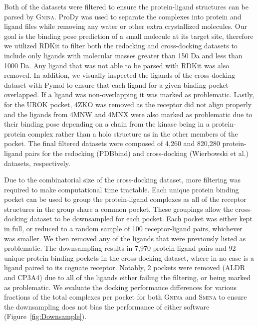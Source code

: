 \documentclass[linenumbers,doublespacing]{bmcart}
\begin{document}
Both of the datasets were filtered to ensure the protein-ligand structures can be parsed by \textsc{Gnina}. ProDy\cite{bakan2011prody} was used to separate the complexes into protein and ligand files while removing any water or other extra crystallized molecules. Our goal is the binding pose prediction of a small molecule at its target site, therefore we utilized RDKit\cite{rdkit} to filter both the redocking and cross-docking datasets to include only ligands with molecular masses greater than 150 Da and less than 1000 Da. Any ligand that was not able to be parsed with RDKit was also removed. In addition, we visually inspected the ligands of the cross-docking dataset with Pymol\cite{PyMOL} to ensure that each ligand for a given binding pocket overlapped. If a ligand was non-overlapping it was marked as problematic. Lastly, for the UROK pocket, 4ZKO was removed as the receptor did not align properly and the ligands from 4MNW and 4MNX were also marked as problematic due to their binding pose depending on a chain from the kinase being in a protein-protein complex rather than a holo structure as in the other members of the pocket. The final filtered datasets were composed of 4,260 and 820,280 protein-ligand pairs for the redocking (PDBbind\cite{liu2017forging}) and cross-docking (Wierbowski et al.\cite{wierbowski2020cross}) datasets, respectively.

Due to the combinatorial size of the cross-docking dataset, more filtering was required to make computational time tractable. Each unique protein binding pocket can be used to group the protein-ligand complexes as all of the receptor structures in the group share a common pocket. These groupings allow the cross-docking dataset to be downsampled for each pocket. Each pocket was either kept in full, or reduced to a random sample of 100 receptor-ligand pairs, whichever was smaller. We then removed any of the ligands that were previously listed as problematic. The downsampling results in 7,970 protein-ligand pairs and 92 unique protein binding pockets in the cross-docking dataset, where in no case is a ligand paired to its cognate receptor. Notably, 2 pockets were removed (ALDR and CP3A4) due to all of the ligands either failing the filtering, or being marked as problematic. We evaluate the docking performance differences for various fractions of the total complexes per pocket for both \textsc{Gnina} and \textsc{Smina} to ensure the downsampling does not bias the performance of either software (Figure~\ref{fig:Downsample}). 
\end{document}
